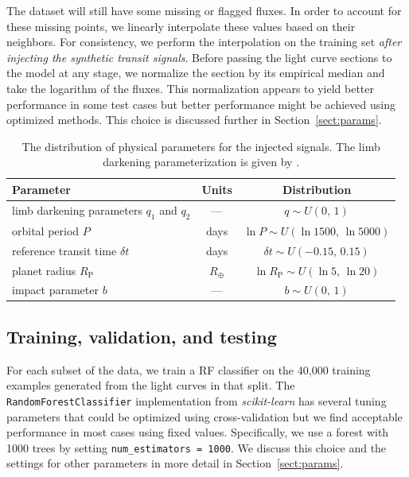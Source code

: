 \documentclass[12pt,preprint]{aastex}
\newcommand{\project}[1]{\textsl{#1}}
\newcommand{\tablabel}[1]{\label{tab:#1}}
\newcommand{\sectionname}{Section}
\newcommand{\sectref}[1]{\ref{sect:#1}}
\newcommand{\Sect}[1]{\sectionname~\sectref{#1}}
\newcommand{\sect}[1]{\Sect{#1}}
\newcommand{\sectlabel}[1]{\label{sect:#1}}
\newcommand{\period}{{\ensuremath{P}}}
\newcommand{\rp}{{\ensuremath{R_\mathrm{P}}}}
\begin{document}
The dataset will still have some missing or flagged fluxes.
In order to account for these missing points, we linearly interpolate these
values based on their neighbors.
For consistency, we perform the interpolation on the training set \emph{after
injecting the synthetic transit signals}.
Before passing the light curve sections to the model at any stage, we
normalize the section by its empirical median and take the logarithm of the
fluxes.
This normalization appears to yield better performance in some test cases but
better performance might be achieved using optimized methods.
This choice is discussed further in \sect{params}.

\begin{table}[htbp]
\begin{center}
\begin{tabular}{lcc}
\toprule
Parameter & Units & Distribution \\
\midrule

limb darkening parameters $q_1$ and $q_2$ & --- & $q \sim U(0,\,1)$ \\
orbital period \period & days & $\ln \period \sim U(\ln 1500,\,\ln 5000)$ \\
reference transit time $\delta t$ & days & $\delta t \sim U(-0.15,\,0.15)$ \\
planet radius \rp & $R_\oplus$ & $\ln \rp \sim U(\ln 5,\,\ln 20)$ \\
impact parameter $b$ & --- & $b \sim U(0,\,1)$ \\

\bottomrule
\end{tabular}
\end{center}
\caption{%
The distribution of physical parameters for the injected signals.
The limb darkening parameterization is given by \citet{Kipping:2013}.
\tablabel{params}}
\end{table}


\subsection{Training, validation, and testing}\sectlabel{train}

For each subset of the data, we train a RF classifier on the 40,000 training
examples generated from the light curves in that split.
The \texttt{RandomForestClassifier} implementation from \project{scikit-learn}
has several tuning parameters that could be optimized using cross-validation
but we find acceptable performance in most cases using fixed values.
Specifically, we use a forest with 1000 trees by setting
\texttt{num\_estimators = 1000}.
We discuss this choice and the settings for other parameters in more detail in
\sect{params}.
\end{document}
